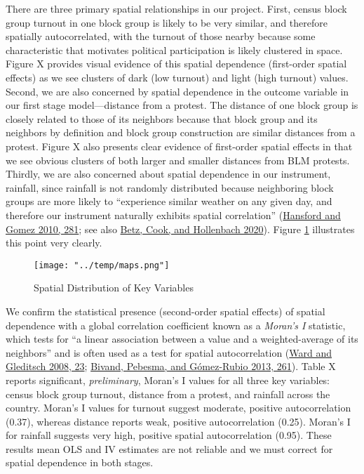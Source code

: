 \documentclass[
  12pt,
]{article}
\begin{document}
There are three primary spatial relationships in our project. First, census block group turnout in one block group is likely to be very similar, and therefore spatially autocorrelated, with the turnout of those nearby because some characteristic that motivates political participation is likely clustered in space. Figure X provides visual evidence of this spatial dependence (first-order spatial effects) as we see clusters of dark (low turnout) and light (high turnout) values. Second, we are also concerned by spatial dependence in the outcome variable in our first stage model---distance from a protest. The distance of one block group is closely related to those of its neighbors because that block group and its neighbors by definition and block group construction are similar distances from a protest. Figure X also presents clear evidence of first-order spatial effects in that we see obvious clusters of both larger and smaller distances from BLM protests. Thirdly, we are also concerned about spatial dependence in our instrument, rainfall, since rainfall is not randomly distributed because neighboring block groups are more likely to ``experience similar weather on any given day, and therefore our instrument naturally exhibits spatial correlation'' (\protect\hyperlink{ref-Hansford2010}{Hansford and Gomez 2010, 281}; see also \protect\hyperlink{ref-Betz2020}{Betz, Cook, and Hollenbach 2020}). Figure \ref{fig:maps} illustrates this point very clearly.

\begin{figure}
\hypertarget{fig:maps}{%
\centering
\texttt{[image: "../temp/maps.png"]}
\caption{Spatial Distribution of Key Variables}\label{fig:maps}
}
\end{figure}

We confirm the statistical presence (second-order spatial effects) of spatial dependence with a global correlation coefficient known as a \emph{Moran's I} statistic, which tests for ``a linear association between a value and a weighted-average of its neighbors'' and is often used as a test for spatial autocorrelation (\protect\hyperlink{ref-Ward2008}{Ward and Gleditsch 2008, 23}; \protect\hyperlink{ref-Bivand2013}{Bivand, Pebesma, and Gómez-Rubio 2013, 261}). Table X reports significant, \emph{preliminary}, Moran's I values for all three key variables: census block group turnout, distance from a protest, and rainfall across the country. Moran's I values for turnout suggest moderate, positive autocorrelation (0.37), whereas distance reports weak, positive autocorrelation (0.25). Moran's I for rainfall suggests very high, positive spatial autocorrelation (0.95). These results mean OLS and IV estimates are not reliable and we must correct for spatial dependence in both stages.
\end{document}
